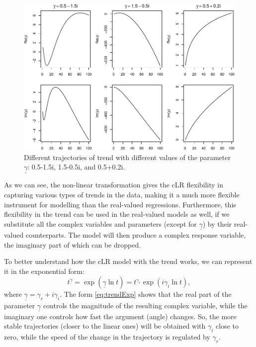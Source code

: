 \documentclass[
]{book}
\begin{document}
\begin{figure}
\centering
\includegraphics{Svetunkov---Svetunkov---Complex-Valued-Econometrics_files/figure-latex/trendTrajectories-1.pdf}
\caption{\label{fig:trendTrajectories}Different trajectories of trend with different values of the parameter \(\underline{\gamma}\): 0.5-1.5i, 1.5-0.5i, and 0.5+0.2i.}
\end{figure}

As we can see, the non-linear transformation gives the cLR flexibility in capturing various types of trends in the data, making it a much more flexible instrument for modelling than the real-valued regressions. Furthermore, this flexibility in the trend can be used in the real-valued models as well, if we substitute all the complex variables and parameters (except for \(\underline{\gamma}\)) by their real-valued counterparts. The model will then produce a complex response variable, the imaginary part of which can be dropped.

To better understand how the cLR model with the trend works, we can represent it in the exponential form:
\begin{equation}
    t^{\underline{\gamma}} = \exp (\underline{\gamma} \ln t) = t^{\gamma_r} \exp (i \gamma_i \ln t),
    \label{eq:trendExp}
\end{equation}
where \(\underline{\gamma}=\gamma_r + i \gamma_i\). The form \eqref{eq:trendExp} shows that the real part of the parameter \(\underline{\gamma}\) controls the magnitude of the resulting complex variable, while the imaginary one controls how fast the argument (angle) changes. So, the more stable trajectories (closer to the linear ones) will be obtained with \(\gamma_i\) close to zero, while the speed of the change in the trajectory is regulated by \(\gamma_r\).
\end{document}
